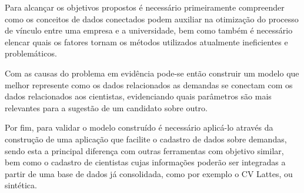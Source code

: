 Para alcançar os objetivos propostos é necessário primeiramente compreender como os conceitos de dados conectados podem auxiliar na otimização do processo de vínculo entre uma empresa e a universidade, bem como também é necessário elencar quais os fatores tornam os métodos utilizados atualmente ineficientes e problemáticos.

Com as causas do problema em evidência pode-se então construir um modelo que melhor represente como os dados relacionados as demandas se conectam com os dados relacionados aos cientistas, evidenciando quais parâmetros são mais relevantes para a sugestão de um candidato sobre outro. 

Por fim, para validar o modelo construído é necessário aplicá-lo através da construção de uma aplicação que facilite o cadastro de dados sobre demandas, sendo esta a principal diferença com outras ferramentas com objetivo similar, bem como o cadastro de cientistas cujas informações poderão ser integradas a partir de uma base de dados já consolidada, como por exemplo o CV Lattes, ou sintética.



